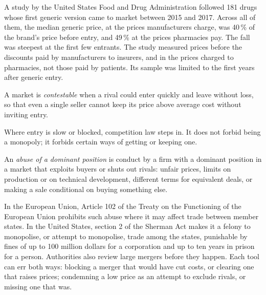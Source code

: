 \begin{record}[Generic entry and the price of a medicine]
A study by the United States Food and Drug Administration followed 181 drugs whose first generic version came to market between 2015 and 2017. Across all of them, the
median generic price, at the prices manufacturers charge, was 40\,\% of the brand's price before entry, and 49\,\% at the prices pharmacies pay. The fall was steepest at
the first few entrants. The study measured prices before the discounts paid by manufacturers to insurers, and in the prices charged to pharmacies, not those paid by
patients. Its sample was limited to the first years after generic entry.
\end{record}

\begin{definition}\label{def:g11:monopoly:contestable}
A market is \emph{contestable} when a rival could enter quickly and leave without loss, so that even a single seller cannot keep its price above
average cost without inviting entry.
\end{definition}

Where entry is slow or blocked, competition law steps in. It does not forbid being a monopoly; it forbids certain ways of getting or keeping one.

\begin{definition}\label{def:g11:monopoly:abuse-of-dominance}
An \emph{abuse of a dominant position} is conduct by a firm with a dominant position in a market that exploits buyers or shuts out
rivals: unfair prices, limits on production or on technical development, different terms for equivalent deals, or making a sale conditional on buying something else.
\end{definition}

In the European Union, Article 102 of the Treaty on the Functioning of the European Union prohibits such abuse where it may affect trade between member states. In the
United States, section 2 of the Sherman Act makes it a felony to monopolise, or attempt to monopolise, trade among the states, punishable by fines of up to 100 million
dollars for a corporation and up to ten years in prison for a person. Authorities also review large mergers before they happen. Each tool can err both ways: blocking a
merger that would have cut costs, or clearing one that raises prices; condemning a low price as an attempt to exclude rivals, or missing one that was.

